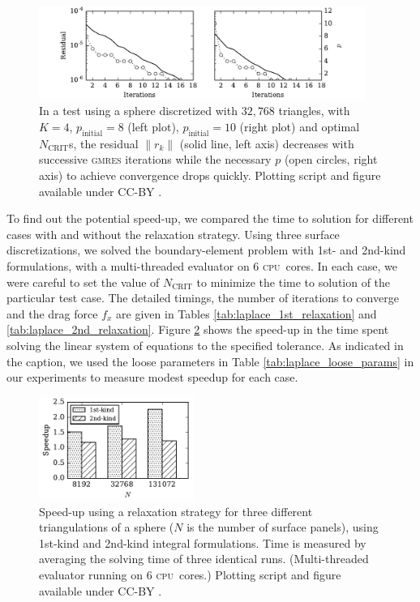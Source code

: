 \documentclass[final,3p,times]{elsarticle}
\newcommand{\cpu}{\textsc{cpu}}
\newcommand{\ncrit}{N_{\text{CRIT}}}
\newcommand{\gmres}{\textsc{gmres}\xspace}
\begin{document}
\begin{figure}%
	\centering
	\includegraphics[natwidth=7in,natheight=2in,width=0.95\textwidth]{LaplaceResidualIterations.pdf}
	\caption{In a test using a sphere discretized with $32,768$ triangles, with $K=4$, $p_\text{initial}=8$ (left plot), $p_\text{initial}=10$ (right plot) and optimal $\ncrit$s, the residual $\|r_{k}\|$  (solid line, left axis) decreases with successive \gmres iterations while the necessary $p$ (open circles, right axis) to achieve convergence drops quickly. Plotting script and figure available under CC-BY \cite{WangLaytonBarba2016-figshare2}.}
	\label{fig:residualp}
\end{figure}

To find out the potential speed-up, we compared the time to solution for different cases with and without the relaxation strategy. Using three surface discretizations, we solved the boundary-element problem with 1st- and 2nd-kind formulations, with a multi-threaded evaluator on 6 \cpu\ cores. In each case, we were careful to set the value of $\ncrit$ to minimize the time to solution of the particular test case. 
The detailed timings, the number of iterations to converge and the drag force $f_x$ are given in Tables \ref{tab:laplace_1st_relaxation} and \ref{tab:laplace_2nd_relaxation}.
Figure \ref{fig:relaxation_timing} shows the speed-up in the time spent solving the linear system of equations to the specified tolerance. 
As indicated in the caption, we used the loose parameters in Table \ref{tab:laplace_loose_params} in our experiments to measure modest speedup for each case.


\begin{figure}%
	\centering
	\includegraphics[natwidth=3in,natheight=2in,width=0.45\textwidth]{LaplaceSpeedupRelaxation.pdf}
	\caption{Speed-up using a relaxation strategy for three different triangulations of a sphere ($N$ is the number of surface panels), using 1st-kind and 2nd-kind integral formulations. Time is measured by averaging the solving time of three identical runs. (Multi-threaded evaluator running on 6 \cpu\ cores.) Plotting script and figure available under CC-BY \cite{WangLaytonBarba2016-figshare2}.}
	\label{fig:relaxation_timing}
\end{figure}
\end{document}
